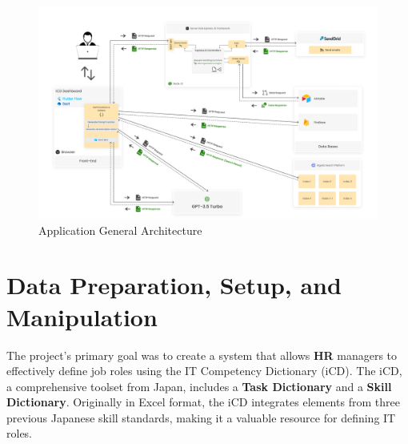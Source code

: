 \begin{landscape}
    \begin{figure}
        \centering
        \includegraphics[width=0.95\linewidth]{src/assets/images/ICD-Application-Global-Architecture-Final-Edition.jpg}
        \caption{Application General Architecture}
        \label{fig:GeneralArchitecture}
    \end{figure}
\end{landscape}



\section{Data Preparation, Setup, and Manipulation}
The project's primary goal was to create a system that allows {\color{newBlue}\textbf{HR}} managers to effectively define job roles using the IT Competency Dictionary (iCD). The iCD, a comprehensive toolset from Japan, includes a {\color{darkPurple}\textbf{Task Dictionary}} and a {\color{darkgreen}\textbf{Skill Dictionary}}. Originally in Excel format, the iCD integrates elements from three previous Japanese skill standards, making it a valuable resource for defining IT roles.


